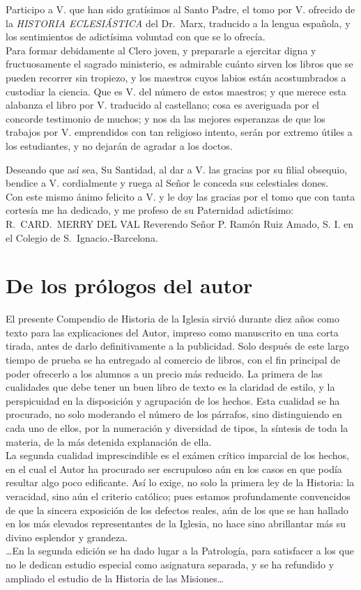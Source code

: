 \raggedbottom{} \documentclass[12pt, a4paper]{book}
\begin{document}
Participo a V. que han sido gratísimos al Santo Padre, el tomo por V. ofrecido de la \textit{HISTORIA ECLESIÁSTICA} del Dr.\ Marx, traducido a la lengua española, y los sentimientos de adictísima voluntad con que se lo ofrecía.\\
Para formar debidamente al Clero joven, y prepararle a ejercitar digna y fructuosamente el sagrado ministerio, es admirable cuánto sirven los libros que se pueden recorrer sin tropiezo, y los maestros cuyos labios están acostumbrados a custodiar la ciencia. Que es V. del número de estos maestros; y que merece esta alabanza el libro por V. traducido al castellano; cosa es averiguada por el concorde testimonio de muchos; y nos da las mejores esperanzas de que los trabajos por V. emprendidos con tan religioso intento, serán por extremo útiles a los estudiantes, y no dejarán de agradar a los doctos.

Deseando que así sea, Su Santidad, al dar a V. las gracias por su filial obsequio, bendice a V. cordialmente y ruega al Señor le conceda sus celestiales dones.\\
Con este mismo ánimo felicito a V. y le doy las gracias por el tomo que con tanta cortesía me ha dedicado, y me profeso de su Paternidad adictísimo:\\
R.\ CARD.\ MERRY DEL VAL
Reverendo Señor P. Ramón Ruiz Amado, S. I. en el Colegio de S.\ Ignacio.\@ -Barcelona.
\section{De los prólogos del autor}
El presente Compendio de Historia de la Iglesia sirvió durante diez años como texto para las explicaciones del Autor, impreso como manuscrito en una corta tirada, antes de darlo definitivamente a la publicidad. Solo después de este largo tiempo de prueba se ha entregado al comercio de libros, con el fin principal de poder ofrecerlo a los alumnos a un precio más reducido. La primera de las cualidades que debe tener un buen libro de texto es la claridad de estilo, y la perspicuidad en la disposición y agrupación de los hechos. Esta cualidad se ha procurado, no solo moderando el número de los párrafos, sino distinguiendo en cada uno de ellos, por la numeración y diversidad de tipos, la síntesis de toda la materia, de la más detenida explanación de ella.\\
La segunda cualidad imprescindible es el exámen crítico imparcial de los hechos, en el cual el Autor ha procurado ser escrupuloso aún en los casos en que podía resultar algo poco edificante. Así lo exige, no solo la primera ley de la Historia: la veracidad, sino aún el criterio católico; pues estamos profundamente convencidos de que la sincera exposición de los defectos reales, aún de los que se han hallado en los más elevados representantes de la Iglesia, no hace sino abrillantar más su divino esplendor y grandeza.\\
\ldots En la segunda edición se ha dado lugar a la Patrología, para satisfacer a los que no le dedican estudio especial como asignatura separada, y se ha refundido y ampliado el estudio de la Historia de las Misiones\ldots
\end{document}
